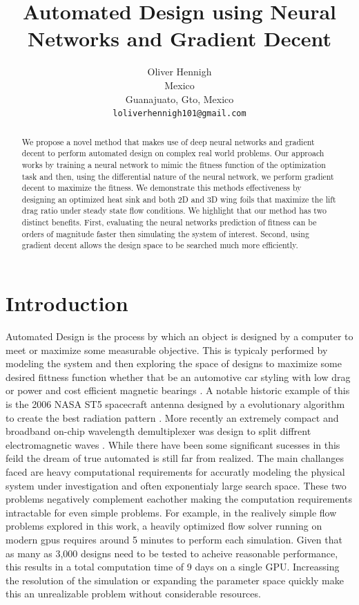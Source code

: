 \documentclass{article} %
\title{Automated Design using Neural Networks and Gradient Decent}
\author{Oliver Hennigh \\
Mexico\\
Guanajuato, Gto, Mexico \\
\texttt{loliverhennigh101@gmail.com} \\
}
\begin{document}
\maketitle

\begin{abstract}

We propose a novel method that makes use of deep neural networks and gradient decent to perform automated design on complex real world problems. Our approach works by training a neural network to mimic the fitness function of the optimization task and then, using the differential nature of the neural network, we perform gradient decent to maximize the fitness. We demonstrate this methods effectiveness by designing an optimized heat sink and both 2D and 3D wing foils that maximize the lift drag ratio under steady state flow conditions. We highlight that our method has two distinct benefits. First, evaluating the neural networks prediction of fitness can be orders of magnitude faster then simulating the system of interest. Second, using gradient decent allows the design space to be searched much more efficiently.

\end{abstract}

\section{Introduction}

Automated Design is the process by which an object is designed by a computer to meet or maximize some measurable objective. This is typicaly performed by modeling the system and then exploring the space of designs to maximize some desired fittness function whether that be an automotive car styling with low drag \cite{ando2010automotive} or power and cost efficient magnetic bearings \cite{dyck1996automated} . A notable historic example of this is the 2006 NASA ST5 spacecraft antenna designed by a evolutionary algorithm to create the best radiation pattern \cite{hornbyautomated}. More recently an extremely compact and broadband on-chip wavelength demultiplexer was design to split diffrent electromagnetic waves \cite{piggott2015inverse}. While there have been some significant sucesses in this feild the dream of true automated is still far from realized. The main challanges faced are heavy computational requirements for accuratly modeling the physical system under investigation and often exponentialy large search space. These two problems negatively complement eachother making the computation requirements intractable for even simple problems. For example, in the realively simple flow problems explored in this work, a heavily optimized flow solver running on modern gpus requires around 5 minutes to perform each simulation. Given that as many as 3,000 designs need to be tested to acheive reasonable performance, this results in a total computation time of 9 days on a single GPU. Increassing the resolution of the simulation or expanding the parameter space quickly make this an unrealizable problem without considerable resources.
\end{document}
